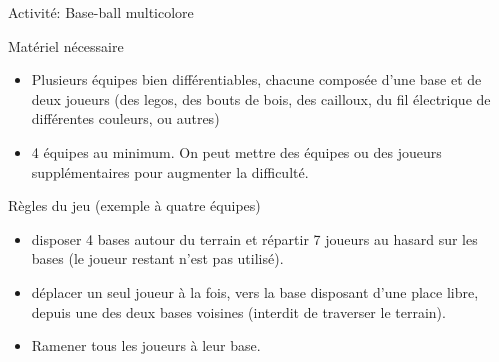 \begin{frame}{Activité: Base-ball multicolore}
  \begin{block}{Matériel nécessaire}
    \begin{itemize}
    \item Plusieurs équipes bien différentiables, chacune composée d'une base et de deux joueurs (des legos, des bouts de bois, des cailloux, du fil électrique de différentes couleurs, ou autres) 
    \item 4 équipes au minimum. On peut mettre des équipes ou des joueurs supplémentaires pour augmenter la difficulté.
    \end{itemize}
  \end{block}

  \begin{block}{Règles du jeu (exemple à quatre équipes)}
    \begin{itemize}
      \item {} disposer 4 bases autour du terrain et répartir 7 joueurs au hasard sur les bases (le joueur restant n'est pas utilisé).
      \item {} déplacer un seul joueur à la fois, vers la base disposant d'une place libre, depuis une des deux bases voisines (interdit de traverser le terrain).
    \item  {} Ramener tous les joueurs à leur base.
    \end{itemize}
  \end{block}

  \bigskip


\end{frame}
